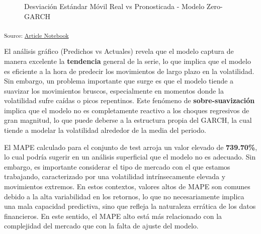 \documentclass[
  number,
  preprint,
  3p,
  onecolumn]{elsarticle}
\begin{document}
\begin{figure}[H]


\caption{\label{fig-predicted-vs-actual-backtest}Desviación Estándar
Móvil Real vs Pronosticada - Modelo Zero-GARCH}

\end{figure}%

\textsubscript{Source:
\href{https://iancont.github.io/fixed_income_garch/index-preview.html}{Article
Notebook}}

El análisis gráfico (Predichos vs Actuales) revela que el modelo captura
de manera excelente la \textbf{tendencia} general de la serie, lo que
implica que el modelo es eficiente a la hora de predecir los movimientos
de largo plazo en la volatilidad. Sin embargo, un problema importante
que surge es que el modelo tiende a suavizar los movimientos bruscos,
especialmente en momentos donde la volatilidad sufre caídas o picos
repentinos. Este fenómeno de \textbf{sobre-suavización} implica que el
modelo no es completamente reactivo a los choques regresivos de gran
magnitud, lo que puede deberse a la estructura propia del GARCH, la cual
tiende a modelar la volatilidad alrededor de la media del periodo.

El MAPE calculado para el conjunto de test arroja un valor elevado de
\textbf{739.70\%}, lo cual podría sugerir en un análisis superficial que
el modelo no es adecuado. Sin embargo, es importante considerar el tipo
de mercado con el que estamos trabajando, caracterizado por una
volatilidad intrínsecamente elevada y movimientos extremos. En estos
contextos, valores altos de MAPE son comunes debido a la alta
variabilidad en los retornos, lo que no necesariamente implica una mala
capacidad predictiva, sino que refleja la naturaleza errática de los
datos financieros. En este sentido, el MAPE alto está más relacionado
con la complejidad del mercado que con la falta de ajuste del modelo.
\end{document}

